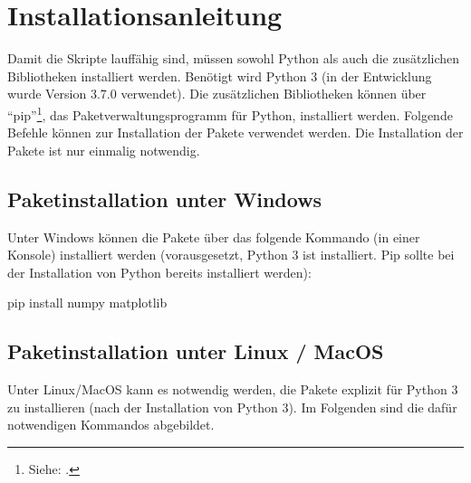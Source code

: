 \section{Installationsanleitung}
Damit die Skripte lauffähig sind, müssen sowohl Python als auch die zusätzlichen Bibliotheken installiert werden.
Benötigt wird Python 3 (in der Entwicklung wurde Version 3.7.0 verwendet).
Die zusätzlichen Bibliotheken können über \enquote{pip}\footnote{ Siehe: \cite{Foundation2019}.}, das Paketverwaltungsprogramm für Python, installiert werden. 
Folgende Befehle können zur Installation der Pakete verwendet werden.
Die Installation der Pakete ist nur einmalig notwendig.

\subsection{Paketinstallation unter Windows}
Unter Windows können die Pakete über das folgende Kommando (in einer Konsole) installiert werden (vorausgesetzt, Python 3 ist installiert. Pip sollte bei der Installation von Python bereits installiert werden):
{}{}

\begin{PipCommandWindows}
pip install numpy matplotlib
\end{PipCommandWindows}

\subsection{Paketinstallation unter Linux / MacOS}

Unter Linux/MacOS kann es notwendig werden, die Pakete explizit für Python 3 zu installieren (nach der Installation von Python 3). Im Folgenden sind die dafür notwendigen Kommandos abgebildet.
{}{}

